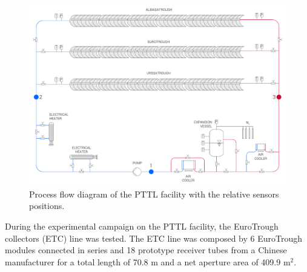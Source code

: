 \documentclass[final,3p,times,review]{elsarticle}
\begin{document}
%
\begin{figure}[h!]
\centering
\includegraphics[width=1\textwidth]{Figures/SchematicSF_V2.pdf}
\caption{Process flow diagram of the PTTL facility with the relative sensors positions.}
\label{fig:PTTL_PI}
\end{figure}
%
During the experimental campaign on the PTTL facility, the EuroTrough collectors (ETC) line was tested. The ETC line was composed by 6 EuroTrough modules connected in series and 18 prototype receiver tubes from a Chinese manufacturer for a total length of 70.8 m and a net aperture area of 409.9 m$^2$.
%
\end{document}
